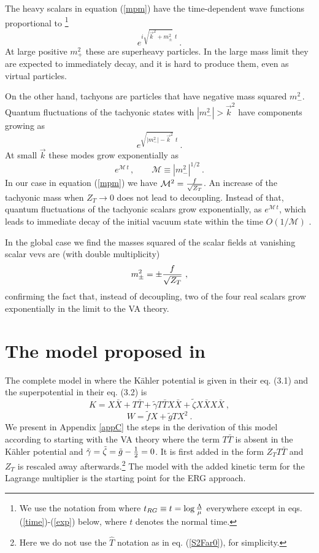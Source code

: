 \documentclass[11pt]{article}
\newcommand{\be}{\begin{equation}}
\newcommand{\ee}{\end{equation}}
\def\K{K{\"a}hler }
\newcommand{\rf}[1]{(\ref{#1})}
\def\be{\begin{equation}}
\def\ee{\end{equation}}
\begin{document}
The heavy scalars in equation \rf{mpm} have the time-dependent wave functions proportional to \footnote{We use the notation from \cite{DallAgata:2022abm} where $t_{RG}\equiv t= \log {\Lambda\over \mu}$ everywhere except in eqs. \rf{time}-\rf{exp} below, where $t$ denotes the normal time. }
\be
e^{i \sqrt {\vec k^2 +m^2_{\pm} } \, \, t} \ .
\label{time}\ee
At large positive $m^2_+$ these are superheavy particles. In the large mass limit they are expected to immediately decay, and it is hard to produce them, even as virtual particles. 
 
On the other hand, tachyons are particles that have negative mass squared $m^2_-$. Quantum fluctuations of the tachyonic states with $|m^2_-|> \vec k^2$ have components growing as 
\be
e^{\sqrt {|m^2_-| - \vec k^2} \, \, t}  \ .
\label{time1}
\ee
At small $\vec k$  these modes grow exponentially as 
\be
 e^{ \mathcal{M} \, t}\, ,  \qquad  \mathcal{M} \equiv  |m^2_-|^{1/2} \ .
\label{exp}\ee
In our case in equation \rf{mpm} we have $\mathcal{M}^2={f\over \sqrt{Z_T}}$. An increase of the tachyonic mass when $Z_T \rightarrow 0$ does not lead to decoupling. Instead of that, quantum fluctuations of the tachyonic scalars grow exponentially, as $e^{ \mathcal{M} \, t}$, which leads to immediate decay of the initial vacuum state  within the time $O(1/ \mathcal{M} )$ \cite{Felder:2001kt}.

In the global case we find the masses squared of the scalar fields at vanishing scalar vevs are (with double multiplicity) 
\be
m^2_{\pm} = \pm  {f \over \sqrt{Z_T}} \ ,
\ee
confirming the fact that, instead of decoupling, two of the four real scalars grow exponentially in the limit to the VA theory.



\section{The model proposed in  \cite{DallAgata:2022abm}}\label{sec4}
The complete model in \cite{DallAgata:2022abm} where the \K potential is given in their eq.  (3.1) and the superpotential in their eq. (3.2) is
\be
K=  X {\bar X} +    T  {\bar T} + \tilde \gamma T  {\bar T}  X  {\bar X}+  \tilde \zeta  X {\bar X}  X  {\bar X} \ ,
\label{Ka}\ee
\be
W=\tilde f  X + \tilde g  T  X^2 \ .
\label{Su}\ee
We present in Appendix \ref{appC} the steps in the derivation of this model according to \cite{DallAgata:2022abm} starting with the VA theory where the term $T\bar T $ is absent in the \K potential and $\tilde \gamma= \tilde \zeta =\tilde g -{1\over 2} =0$. It is first added in the form $Z_TT\bar T$ and $Z_T$ is rescaled away afterwards.\footnote{Here we do not use the $\hat T$ notation as in eq. \rf{S2Far0}, for simplicity.} The model with the added kinetic term for the Lagrange multiplier is the starting point for the ERG approach.
\end{document}
